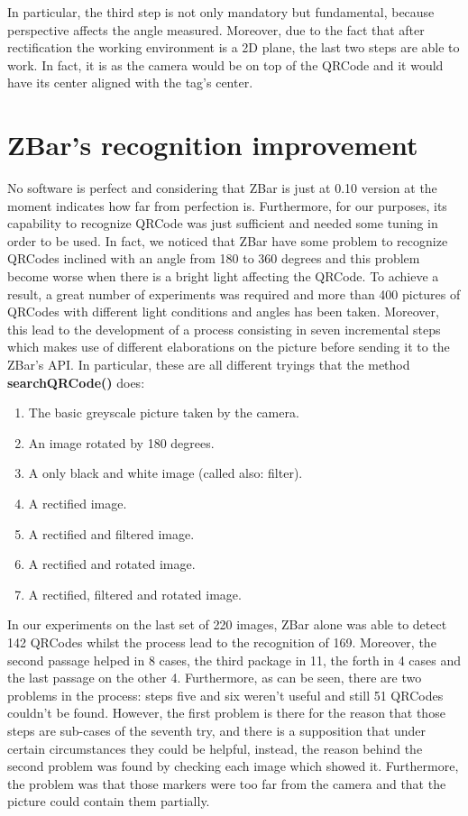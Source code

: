 In particular, the third step is not only mandatory but fundamental, because perspective affects the angle measured. Moreover, due to the fact that after rectification the working environment is a 2D plane, the last two steps are able to work. In fact, it is as the camera would be on top of the QRCode and it would have its center aligned with the tag's center.

\section{ZBar's recognition improvement} 
No software is perfect and considering that ZBar is just at 0.10 version at the moment indicates how far from perfection is. Furthermore, for our purposes, its capability to recognize QRCode was just sufficient and needed some tuning in order to be used. In fact, we noticed that ZBar have some problem to recognize QRCodes inclined with an angle from 180 to 360 degrees and this problem become worse when there is a bright light affecting the QRCode. To achieve a result, a great number of experiments was required and more than 400 pictures of QRCodes with different light conditions and angles has been taken. Moreover, this lead to the development of a process consisting in seven incremental steps which makes use of different elaborations on the picture before sending it to the ZBar's API.
In particular, these are all different tryings that the method \textbf{searchQRCode()} does:

\begin{enumerate}
	\item The basic greyscale picture taken by the camera.
	\item An image rotated by 180 degrees.
	\item A only black and white image (called also: filter).
	\item A rectified image.
	\item A rectified and filtered image.
	\item A rectified and rotated image.
	\item A rectified, filtered and rotated image.
\end{enumerate}

In our experiments on the last set of 220 images, ZBar alone was able to detect 142 QRCodes whilst the process lead to the recognition of 169. Moreover, the second passage helped in 8 cases, the third package in 11, the forth in 4 cases and the last passage on the other 4. Furthermore, as can be seen, there are two problems in the process: steps five and six weren't useful and still 51 QRCodes couldn't be found. However, the first problem is there for the reason that those steps are sub-cases of the seventh try, and there is a supposition that under certain circumstances they could be helpful, instead, the reason behind the second problem was found by checking each image which showed it. Furthermore, the problem was that those markers were too far from the camera and that the picture could contain them partially.

